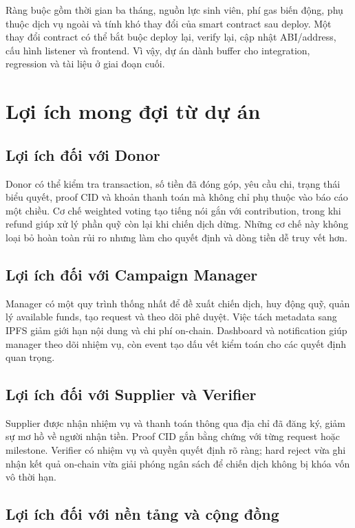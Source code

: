 Ràng buộc gồm thời gian ba tháng, nguồn lực sinh viên, phí gas biến động, phụ thuộc dịch vụ ngoài và tính khó thay đổi của smart contract sau deploy. Một thay đổi contract có thể bắt buộc deploy lại, verify lại, cập nhật ABI/address, cấu hình listener và frontend. Vì vậy, dự án dành buffer cho integration, regression và tài liệu ở giai đoạn cuối.

\section{Lợi ích mong đợi từ dự án}

\subsection{Lợi ích đối với Donor}

Donor có thể kiểm tra transaction, số tiền đã đóng góp, yêu cầu chi, trạng thái biểu quyết, proof CID và khoản thanh toán mà không chỉ phụ thuộc vào báo cáo một chiều. Cơ chế weighted voting tạo tiếng nói gắn với contribution, trong khi refund giúp xử lý phần quỹ còn lại khi chiến dịch dừng. Những cơ chế này không loại bỏ hoàn toàn rủi ro nhưng làm cho quyết định và dòng tiền dễ truy vết hơn.

\subsection{Lợi ích đối với Campaign Manager}

Manager có một quy trình thống nhất để đề xuất chiến dịch, huy động quỹ, quản lý available funds, tạo request và theo dõi phê duyệt. Việc tách metadata sang IPFS giảm giới hạn nội dung và chi phí on-chain. Dashboard và notification giúp manager theo dõi nhiệm vụ, còn event tạo dấu vết kiểm toán cho các quyết định quan trọng.

\subsection{Lợi ích đối với Supplier và Verifier}

Supplier được nhận nhiệm vụ và thanh toán thông qua địa chỉ đã đăng ký, giảm sự mơ hồ về người nhận tiền. Proof CID gắn bằng chứng với từng request hoặc milestone. Verifier có nhiệm vụ và quyền quyết định rõ ràng; hard reject vừa ghi nhận kết quả on-chain vừa giải phóng ngân sách để chiến dịch không bị khóa vốn vô thời hạn.

\subsection{Lợi ích đối với nền tảng và cộng đồng}

